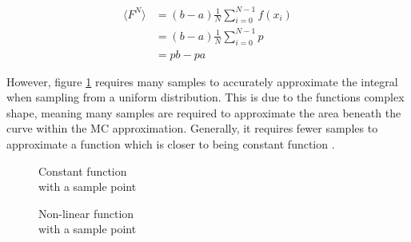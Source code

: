 \documentclass[../dissertation.tex]{subfiles}
\begin{document}
\begin{align}
\label{eq:constant_monte_carlo}
\langle F^N \rangle & = (b - a) \frac{1}{N} \sum^{N-1}_{i=0} f(x_i)\\
& = (b - a)  \frac{1}{N} \sum^{N-1}_{i=0} p \nonumber \\
& = pb - pa \nonumber
\end{align}

However, figure \ref{fig:non_lin_function} requires many samples to accurately approximate the integral when sampling from a uniform distribution. This is due to the functions complex shape, meaning many samples are required to approximate the area beneath the curve within the MC approximation. Generally, it requires fewer samples to approximate a function which is closer to being constant function \cite{morokoff1995quasi}.

\begin{figure}[h]
\captionsetup{justification=centering}
\centering
\begin{minipage}{.33\textwidth}
    \hspace*{\fill}%
     \caption{Constant function\\ with a sample point}
  \label{fig:constant_function}
\end{minipage}
\hspace{8em}
\begin{minipage}{.33\textwidth}
    
  \hspace*{\fill}%

  \caption{ Non-linear function\\ with a sample point}
  \label{fig:non_lin_function}
\end{minipage}
\end{figure}
\end{document}
